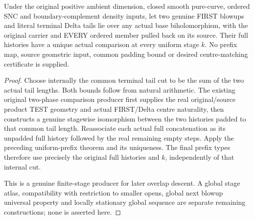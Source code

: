 \begin{theorem}
\label{hir:sharp-actual-curve-original-uniform-prefix-comparison}
\leanok
Under the original positive ambient dimension, closed smooth pure-curve,
ordered SNC and boundary-complement density inputs, let two genuine FIRST
blowups and literal terminal Delta tails lie over any actual base
biholomorphism, with the original carrier and EVERY ordered member pulled
back on its source. Their full histories have a unique actual comparison
at every uniform stage $k$. No prefix map, source geometric input, common
padding bound or desired centre-matching certificate is supplied.
\end{theorem}
\begin{proof}
Choose internally the common terminal tail cut to be the sum of the two
actual tail lengths. Both bounds follow from natural arithmetic. The
existing original two-phase comparison producer first supplies the real
original/source product TEST geometry and actual FIRST/Delta centre
naturality, then constructs a genuine stagewise isomorphism between the
two histories padded to that common tail length. Reassociate each actual
full concatenation as its unpadded full history followed by the real
remaining empty steps. Apply the preceding uniform-prefix theorem and
its uniqueness. The final prefix types therefore use precisely the
original full histories and $k$, independently of that internal cut.

This is a genuine finite-stage producer for later overlap descent. A
global stage atlas, compatibility with restriction to smaller opens,
global next blowup universal property and locally stationary global
sequence are separate remaining constructions; none is asserted here.
\end{proof}
